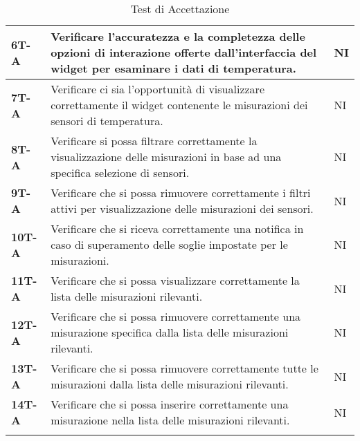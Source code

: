 \begin{longtable}{|>{\raggedright\arraybackslash}m{}|>{\raggedright\arraybackslash}m{}|>{\raggedright\arraybackslash}m{}|}
	\hline
	\textbf{6T-A}   & Verificare l’accuratezza e la completezza delle opzioni di interazione offerte dall’interfaccia del widget per esaminare i dati di temperatura.                       & NI             \\
	\hline
	\textbf{7T-A}   & Verificare ci sia l’opportunità di visualizzare correttamente il widget contenente le misurazioni dei sensori di temperatura.                                         & NI             \\
	\hline
	\textbf{8T-A}   & Verificare si possa filtrare correttamente la visualizzazione delle misurazioni in base ad una specifica selezione di sensori.                                        & NI             \\
	\hline
	\textbf{9T-A}   & Verificare che si possa rimuovere correttamente i filtri attivi per visualizzazione delle misurazioni dei sensori.                                                    & NI             \\
	\hline
	\textbf{10T-A}  & Verificare che si riceva correttamente una notifica in caso di superamento delle soglie impostate per le misurazioni.                                                 & NI             \\
	\hline
	\textbf{11T-A}  & Verificare che si possa visualizzare correttamente la lista delle misurazioni rilevanti.                                                                              & NI             \\
	\hline
	\textbf{12T-A}  & Verificare che si possa rimuovere correttamente una misurazione specifica dalla lista delle misurazioni rilevanti.                                                    & NI             \\
	\hline
	\textbf{13T-A}  & Verificare che si possa rimuovere correttamente tutte le misurazioni dalla lista delle misurazioni rilevanti.                                                         & NI             \\
	\hline
	\textbf{14T-A}  & Verificare che si possa inserire correttamente una misurazione nella lista delle misurazioni rilevanti.                                                               & NI             \\
	\hline
	\caption{Test di Accettazione} %
	\label{table:16}
\end{longtable}
